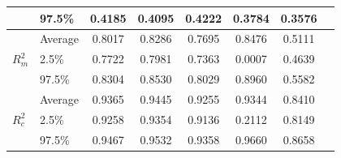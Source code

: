 \begin{table}[H]
\begin{tabular}{@{}llcccccc@{}}
                                         & 97.5\%  & 0.4185 & 0.4095 & 0.4222 & 0.3784 & 0.3576 \\ \midrule
    \multirow{3}{*}{$R^2_m$}            & Average & 0.8017 & 0.8286 & 0.7695 & 0.8476 & 0.5111 \\
                                         & 2.5\%   & 0.7722 & 0.7981 & 0.7363 & 0.0007 & 0.4639 \\
                                         & 97.5\%  & 0.8304 & 0.8530 & 0.8029 & 0.8960 & 0.5582 \\ \midrule
    \multirow{3}{*}{$R^2_c$}            & Average & 0.9365 & 0.9445 & 0.9255 & 0.9344 & 0.8410 \\
                                         & 2.5\%   & 0.9258 & 0.9354 & 0.9136 & 0.2112 & 0.8149 \\
                                         & 97.5\%  & 0.9467 & 0.9532 & 0.9358 & 0.9660 & 0.8658 \\ \bottomrule
    \end{tabular}

\end{table}
